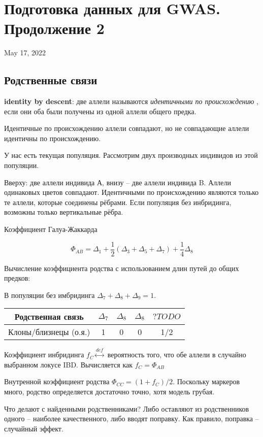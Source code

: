 \documentclass[main.tex]{sufbfiles}
\begin{document}
	
\section{ Подготовка данных для GWAS. Продолжение 2 }
May 17, 2022
\subsection{ Родственные связи }
\textbf{identity by descent}: две аллели называются  \textit{ идентичными по происхождению }, если они оба были получены из одной аллели общего предка.

Идентичные по происхождению аллели совпадают, но не совпадающие аллели идентичны по происхождению.

У нас есть текущая популяция.
Рассмотрим двух производных индивидов из этой популяции.

Вверху: две аллели индивида А, внизу -- две аллели индивида B.
Аллели одинаковых цветов совпадают.
Идентичными по происхождению являются только те аллели, которые соединены рёбрами.
Если популяция без инбридинга, возможны только вертикальные рёбра.

Коэффициент Галуа-Жаккарда

\[ \Phi_{AB} = \Delta_1 + \frac{1}{2} \left( \Delta_3 + \Delta_5 + \Delta_7 \right) + \frac{1}{4} \Delta_8 \]

Вычисление коэффициента родства с использованием длин путей до общих предков:

В популяции без имбридинга $ \Delta_7 + \Delta_8 + \Delta_9 = 1 $.

\begin{tabular}{ccccc}
	Родственная связь & $ \Delta_7 $ & $ \Delta_8 $ & $ \Delta_8 $ & $ ?TODO$ \\
	\hline
	Клоны/близнецы (о.я.) & 1 & 0 & 0 & 1/2  \\
\end{tabular}



Коэффициент инбридинга $ f_C \overset{def}\leftrightarrow $  вероятность того, что обе аллели в случайно выбранном локусе IBD.
Вычисляется как $ f_C = \Phi_{AB} $

Внутренной коэффициент родства $ \Phi_{CC} = (1 + f_C)/2 $.
Поскольку маркеров много, родство определяется достаточно точно, хотя модель грубая.

Что делают с найденными родственниками?
Либо оставляют из родственников одного -- наиболее качественного, либо вводят поправку.
Как правило, поправка -- случайный эффект.
\end{document}
